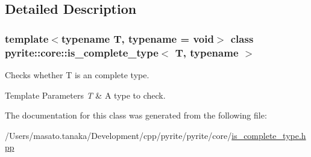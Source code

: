 \subsection{Detailed Description}
\subsubsection*{template$<$typename T, typename = void$>$\newline
class pyrite\+::core\+::is\+\_\+complete\+\_\+type$<$ T, typename $>$}

Checks whether T is an complete type. 
\begin{DoxyTemplParams}{Template Parameters}
{\em T} & A type to check. \\
\hline
\end{DoxyTemplParams}


The documentation for this class was generated from the following file\+:\begin{DoxyCompactItemize}
\item 
/\+Users/masato.\+tanaka/\+Development/cpp/pyrite/pyrite/core/\mbox{\hyperlink{core_2is__complete__type_8hpp}{is\+\_\+complete\+\_\+type.\+hpp}}\end{DoxyCompactItemize}
